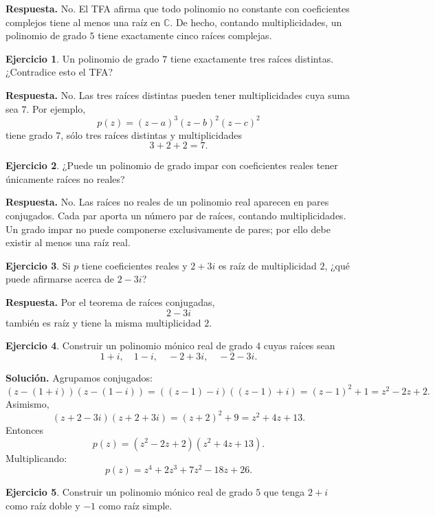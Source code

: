 \documentclass[12pt]{article}
\theoremstyle{definition}
\newtheorem{ejercicio}{Ejercicio}[section]
\theoremstyle{remark}
\newcommand{\C}{\mathbb{C}}
\begin{document}
\textbf{Respuesta.}
No. El TFA afirma que todo polinomio no constante con coeficientes complejos
tiene al menos una raíz en $\C$. De hecho, contando multiplicidades, un
polinomio de grado $5$ tiene exactamente cinco raíces complejas.

\begin{ejercicio}
Un polinomio de grado $7$ tiene exactamente tres raíces distintas. ¿Contradice
esto el TFA?
\end{ejercicio}

\textbf{Respuesta.}
No. Las tres raíces distintas pueden tener multiplicidades cuya suma sea $7$.
Por ejemplo,
\[
p(z)=(z-a)^3(z-b)^2(z-c)^2
\]
tiene grado $7$, sólo tres raíces distintas y multiplicidades
\[
3+2+2=7.
\]

\begin{ejercicio}
¿Puede un polinomio de grado impar con coeficientes reales tener únicamente
raíces no reales?
\end{ejercicio}

\textbf{Respuesta.}
No. Las raíces no reales de un polinomio real aparecen en pares conjugados.
Cada par aporta un número par de raíces, contando multiplicidades. Un grado
impar no puede componerse exclusivamente de pares; por ello debe existir al
menos una raíz real.

\begin{ejercicio}
Si $p$ tiene coeficientes reales y $2+3i$ es raíz de multiplicidad $2$, ¿qué
puede afirmarse acerca de $2-3i$?
\end{ejercicio}

\textbf{Respuesta.}
Por el teorema de raíces conjugadas,
\[
\boxed{2-3i}
\]
también es raíz y tiene la misma multiplicidad $2$.

\begin{ejercicio}
Construir un polinomio mónico real de grado $4$ cuyas raíces sean
\[
1+i,\quad1-i,\quad-2+3i,\quad-2-3i.
\]
\end{ejercicio}

\textbf{Solución.}
Agrupamos conjugados:
\[
(z-(1+i))(z-(1-i))
=((z-1)-i)((z-1)+i)
=(z-1)^2+1
=z^2-2z+2.
\]
Asimismo,
\[
(z+2-3i)(z+2+3i)
=(z+2)^2+9
=z^2+4z+13.
\]
Entonces
\[
p(z)=(z^2-2z+2)(z^2+4z+13).
\]
Multiplicando:
\[
\boxed{
p(z)=z^4+2z^3+7z^2-18z+26.
}
\]

\begin{ejercicio}
Construir un polinomio mónico real de grado $5$ que tenga $2+i$ como raíz
doble y $-1$ como raíz simple.
\end{ejercicio}
\end{document}
